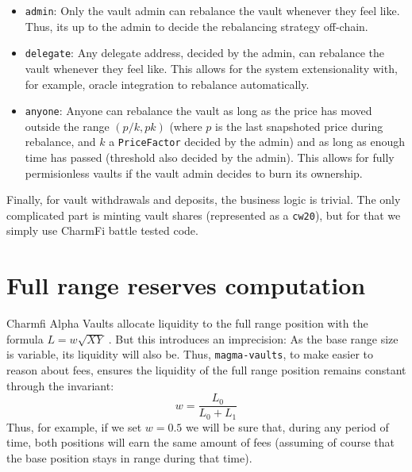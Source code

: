 \documentclass[11pt]{article}
\begin{document}
\begin{itemize}
    \item \texttt{admin}: Only the vault admin can rebalance the vault whenever they
        feel like. Thus, its up to the admin to decide the rebalancing strategy off-chain.
    \item \texttt{delegate}: Any delegate address, decided by the admin, can rebalance
        the vault whenever they feel like. This allows for the system extensionality with,
        for example, oracle integration to rebalance automatically.
    \item \texttt{anyone}: Anyone can rebalance the vault as long as the price
        has moved outside the range $(p/k, pk)$ (where $p$ is the last
        snapshoted price during rebalance, and $k$ a \texttt{PriceFactor}
        decided by the admin) and as long as enough time has passed (threshold also
        decided by the admin). This allows for fully permisionless vaults if the
        vault admin decides to burn its ownership.
\end{itemize}
Finally, for vault withdrawals and deposits, the business logic is trivial. The
only complicated part is minting vault shares (represented as a \texttt{cw20}),
but for that we simply use CharmFi battle tested code.

\section{Full range reserves computation}
Charmfi Alpha Vaults allocate liquidity to the full range position with
the formula $L = w\sqrt{XY}$ \cite{charmfi-liquidity-computation}. But this
introduces an imprecision: As the base range size is variable, its liquidity
will also be. Thus, \texttt{magma-vaults}, to make easier to reason about fees,
ensures the liquidity of the full range position remains constant through the
invariant:
\[
w = \frac{L_0}{L_0 + L_1}
\]
Thus, for example, if we set $w = 0.5$ we will be sure that, during any period
of time, both positions will earn the same amount of fees (assuming of course that
the base position stays in range during that time).
\end{document}
